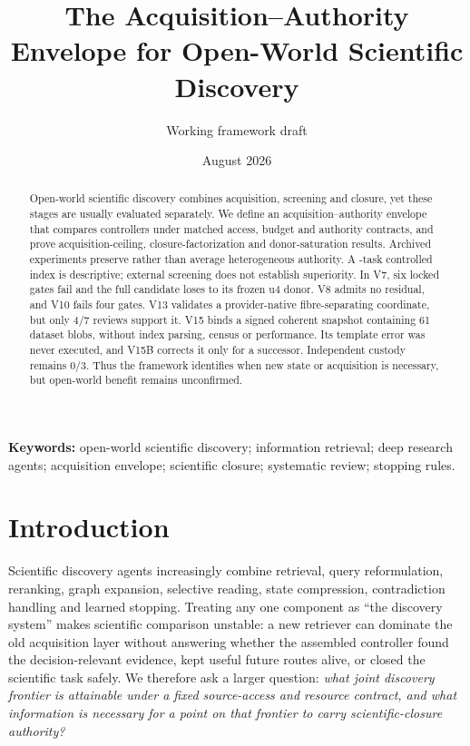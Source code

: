 \documentclass[11pt]{article}
\title{The Acquisition--Authority Envelope for Open-World Scientific Discovery}
\author{Working framework draft}
\date{August 2026}
\theoremstyle{definition}
\begin{document}
\maketitle

\begin{abstract}
Open-world scientific discovery combines acquisition, screening and closure,
yet these stages are usually evaluated separately. We define an
acquisition--authority envelope that compares controllers under matched access,
budget and authority contracts, and prove acquisition-ceiling,
closure-factorization and donor-saturation results. Archived experiments
preserve rather than average heterogeneous authority. A \OfflineTaskCount{}-task controlled
index is descriptive; external screening does not establish superiority. In
V7, six locked gates fail and the full candidate loses to its frozen u4 donor.
V8 admits no residual, and V10 fails four gates. V13 validates a provider-native
fibre-separating coordinate, but only 4/7 reviews support it. V15 binds a signed
coherent snapshot containing 61 dataset blobs, without index parsing, census or
performance. Its template error was never executed, and V15B corrects it only
for a successor. Independent custody remains 0/3. Thus the framework identifies
when new state or acquisition is necessary, but open-world benefit remains
unconfirmed.
\end{abstract}

\noindent\textbf{Keywords:} open-world scientific discovery; information retrieval; deep research agents; acquisition envelope; scientific closure; systematic review; stopping rules.

\section{Introduction}
Scientific discovery agents increasingly combine retrieval, query reformulation,
reranking, graph expansion, selective reading, state compression, contradiction
handling and learned stopping.  Treating any one component as ``the discovery
system'' makes scientific comparison unstable: a new retriever can dominate the
old acquisition layer without answering whether the assembled controller found
the decision-relevant evidence, kept useful future routes alive, or closed the
scientific task safely.  We therefore ask a larger question: \emph{what joint
discovery frontier is attainable under a fixed source-access and resource
contract, and what information is necessary for a point on that frontier to
carry scientific-closure authority?}
\end{document}
